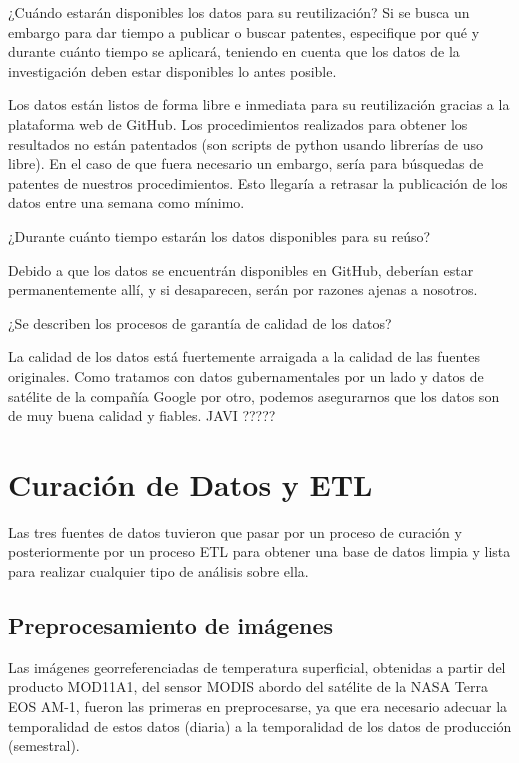 \documentclass[12pt, spanish]{article}
\begin{document}
\begin{shaded}
¿Cuándo estarán disponibles los datos para su reutilización? Si se busca un embargo para dar tiempo a publicar o buscar patentes, especifique por qué y durante cuánto tiempo se aplicará, teniendo en cuenta que los datos de la investigación deben estar disponibles lo antes posible.
\end{shaded}
Los datos están listos de forma libre e inmediata para su reutilización gracias a la plataforma web de GitHub. Los procedimientos realizados para obtener los resultados no están patentados (son scripts de python usando librerías de uso libre). En el caso de que fuera necesario un embargo, sería para búsquedas de patentes de nuestros procedimientos. Esto llegaría a retrasar la publicación de los datos entre una semana como mínimo.
\\
\begin{shaded}
¿Durante cuánto tiempo estarán los datos disponibles para su reúso?
\end{shaded}
Debido a que los datos se encuentrán disponibles en GitHub, deberían estar permanentemente allí, y si desaparecen, serán por razones ajenas a nosotros.

\begin{shaded}
¿Se describen los procesos de garantía de calidad de los datos?
\end{shaded}
La calidad de los datos está fuertemente arraigada a la calidad de las fuentes originales. Como tratamos con datos gubernamentales por un lado y datos de satélite de la compañía Google por otro, podemos asegurarnos que los datos son de muy buena calidad y fiables.
JAVI ?????



\section{Curación de Datos y ETL}

Las tres fuentes de datos tuvieron que pasar por un proceso de curación y posteriormente por un proceso ETL para obtener una base de datos limpia y lista para realizar cualquier tipo de análisis sobre ella.

\subsection{Preprocesamiento de imágenes}

Las imágenes georreferenciadas de temperatura superficial, obtenidas a partir del producto MOD11A1, del sensor MODIS abordo del satélite de la NASA Terra EOS AM-1, fueron las primeras en preprocesarse, ya que era necesario adecuar la temporalidad de estos datos (diaria) a la temporalidad de los datos de producción (semestral).
\end{document}
